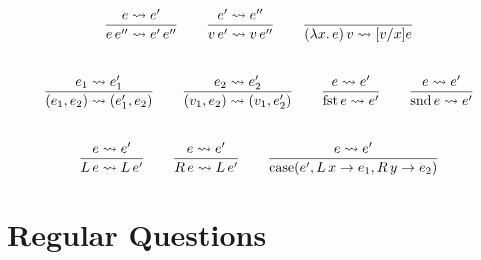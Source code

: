 \documentclass[10pt,\jkfside,a4paper]{article}
\begin{document}
\begin{enumerate}
    \begin{gather*}
        \dfrac{
            e \rightsquigarrow e'
        }{
            e\, e'' \rightsquigarrow e'\, e''
        }
        \qquad
        \dfrac{
            e' \rightsquigarrow e''
        }{
            v\, e' \rightsquigarrow v\, e''
        }
        \qquad
        \dfrac{
        }{
            (\lambda x \ldotp e)\, v \rightsquigarrow [v/x]e
        }
        \\[2em]
        \dfrac{
            e_1 \rightsquigarrow e_1'
        }{
            (e_1, e_2) \rightsquigarrow (e_1', e_2)
        }
        \qquad
        \dfrac{
            e_2 \rightsquigarrow e_2'
        }{
            (v_1, e_2) \rightsquigarrow (v_1, e_2')
        }
        \qquad
        \dfrac{
            e \rightsquigarrow e'
        }{
            \mathrm{fst}\, e \rightsquigarrow e'
        }
        \qquad
        \dfrac{
            e \rightsquigarrow e'
        }{
            \mathrm{snd}\, e \rightsquigarrow e'
        }
        \\[2em]
        \dfrac{
            e \rightsquigarrow e'
        }{
            L\, e \rightsquigarrow L\, e'
        }
        \qquad
        \dfrac{
            e \rightsquigarrow e'
        }{
            R\, e \rightsquigarrow L\, e'
        }
        \qquad
        \dfrac{
            e \rightsquigarrow e'
        }{
            \mathrm{case}(e', L\, x \to e_1, R\, y \to e_2)
        }
    \end{gather*}

\end{enumerate}

\section{Regular Questions}
\end{document}
